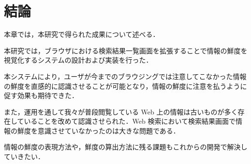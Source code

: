 \chapter{結論}
\label{chap:conclusion}

本章では，本研究で得られた成果について述べる．

\newpage

本研究では，ブラウザにおける検索結果一覧画面を拡張することで情報の鮮度を視覚化するシステムの設計および実装を行った．

本システムにより，ユーザが今までのブラウジングでは注意してこなかった情報の鮮度を直感的に認識させることが可能となり，情報の鮮度に注意を払うように促す効果も期待できた．

また，運用を通して我々が普段閲覧している Web 上の情報は古いものが多く存在していることを改めて認識させられた．Web 検索において検索結果画面で情報の鮮度を意識させていなかったのは大きな問題である．

情報の鮮度の表現方法や，鮮度の算出方法に残る課題もこれからの開発で解決していきたい．
